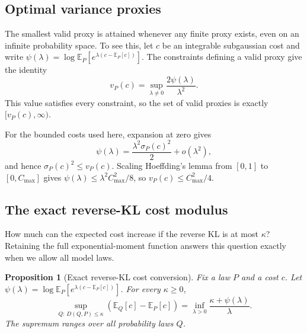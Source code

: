 \documentclass[11pt,twoside]{article}
\newcommand{\E}{\mathbb E}
\newcommand{\KL}{D}
\newtheorem{proposition}[theorem]{Proposition}
\theoremstyle{definition}
\theoremstyle{remark}
\begin{document}
\subsection{Optimal variance proxies}
\label{app:optimal-proxy}

The smallest valid proxy is attained whenever any finite proxy exists,
even on an infinite probability space. To see this, let \(c\) be an
integrable subgaussian cost and write
\(\psi(\lambda)=\log\E_P[e^{\lambda(c-\E_P[c])}]\).
The constraints defining a valid proxy give the identity
\[
 v_P(c)=\sup_{\lambda\ne0}\frac{2\psi(\lambda)}{\lambda^2}.
\]
This value satisfies every constraint, so the set of valid proxies is
exactly \([v_P(c),\infty)\).

For the bounded costs used here, expansion at zero gives
\[
 \psi(\lambda)=\frac{\lambda^2\sigma_P(c)^2}{2}+o(\lambda^2),
\]
and hence \(\sigma_P(c)^2\le v_P(c)\).
Scaling Hoeffding's lemma from \([0,1]\) to \([0,C_{\max}]\) gives
\(\psi(\lambda)\le\lambda^2C_{\max}^2/8\), so
\(v_P(c)\le C_{\max}^2/4\).

\subsection{The exact reverse-KL cost modulus}
\label{app:reverse-modulus}

How much can the expected cost increase if the reverse KL is at most
\(\kappa\)? Retaining the full exponential-moment function answers this
question exactly when we allow all model laws.

\begin{proposition}[Exact reverse-KL cost conversion]
\label{prop:reverse-modulus}
Fix a law \(P\) and a cost \(c\).
Let \(\psi(\lambda)=\log\E_P[
e^{\lambda(c-\E_P[c])}]\). For every \(\kappa\ge0\),
\begin{equation}
 \sup_{Q:\,\KL(Q, P)\le\kappa}
       (\E_Q[c]-\E_P[c])
 =\inf_{\lambda>0}\frac{\kappa+\psi(\lambda)}{\lambda}.
 \label{eq:reverse-modulus}
\end{equation}
The supremum ranges over all probability laws \(Q\).
\end{proposition}
\end{document}
